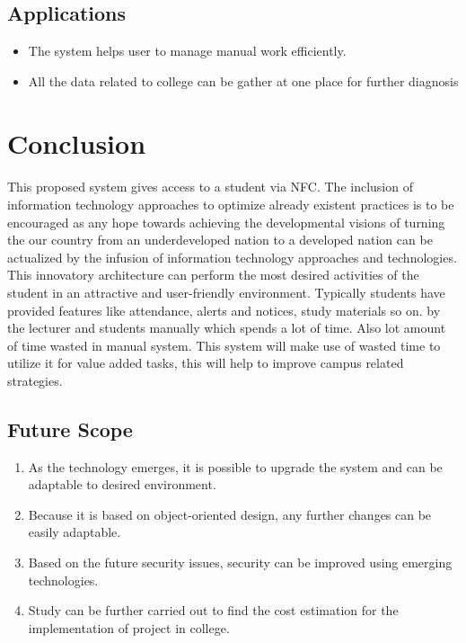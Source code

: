 \documentclass[10pt,a4paper]
{article}
\numberwithin{table}{section}
\begin{document}
{{\begin{normalsize}
\begin{itemize}
\end{itemize}


\subsection{Applications}
\begin{itemize}
\item The system helps user to manage manual work efficiently. \\
\item All the data related to college can be gather at one place for further diagnosis \\
\end{itemize}

\newpage
\section{Conclusion}
\paragraph{}This proposed system gives access to a student via NFC. The inclusion of information technology approaches to optimize already existent practices is to be encouraged as any hope towards achieving the developmental visions of turning the our country from an underdeveloped nation to a developed nation can be actualized by the infusion of information technology approaches and technologies. This innovatory architecture can perform the most desired activities of the student in an attractive and user-friendly environment. 
Typically students have provided features like attendance, alerts and notices, study materials so on. by the lecturer and students manually which spends a lot of time. Also lot amount of time wasted in manual system. This system will make use of wasted time to utilize it for value added tasks, this will help to improve campus related strategies.
    


\subsection{Future Scope}

\begin{enumerate}
\item As the technology emerges, it is possible to upgrade the system and can be adaptable to desired environment. 
\item  Because it is based on object-oriented design, any further changes can be easily adaptable.
\item Based on the future security issues, security can be improved using emerging technologies.
\item Study can be further carried out to find the cost estimation for the implementation  of project in college. 


\end{enumerate}
\end{normalsize}}}
\end{document}
